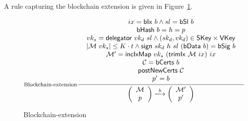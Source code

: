 \documentclass[11pt,a4paper]{article}
\newcommand{\fun}[1]{\mathsf{#1}}
\newcommand{\type}[1]{\mathsf{#1}}
\newcommand{\size}[1]{\left| #1 \right|}
\newcommand{\trans}[2]{\xlongrightarrow[\textsc{#1}]{#2}}
\newcommand{\SKey}{\type{SKey}}
\newcommand{\VKey}{\type{VKey}}
\newcommand{\hashname}{bHash}
\newcommand{\signname}{sign}
\newcommand{\delegatorname}{delegator} %
\newcommand{\signmapname}{\mathcal{M}}
\newcommand{\trimixname}{trimIx}
\newcommand{\incixmapname}{incIxMap}
\newcommand{\postnewcertsname}{postNewCerts}
\newcommand{\bdataname}{bData}
\newcommand{\bcertsname}{bCerts}
\newcommand{\bsigname}{bSig}
\newcommand{\bixname}{bIx}
\newcommand{\bslname}{bSl}
\newcommand{\sign}[4]{\fun{\signname}\ #1 ~ #2 ~ #3 ~ #4}
\newcommand{\hash}[1]{\fun{\hashname}\ #1}
\newcommand{\delegator}[2]{\fun{\delegatorname} ~ #1 ~ #2}
\newcommand{\signmap}[1]{\fun{\signmapname} ~ #1}
\newcommand{\trimix}[2]{\fun{\trimixname} ~ #1 ~ #2}
\newcommand{\incixmap}[3]{\fun{\incixmapname} ~ #1 ~ #2 ~ #3}
\newcommand{\postnewcerts}[1]{\fun{\postnewcertsname} ~ #1}
\newcommand{\bdata}[1]{\fun{\bdataname} ~ #1}
\newcommand{\bcerts}[1]{\fun{\bcertsname} ~ #1}
\newcommand{\bsig}[1]{\fun{\bsigname} ~ #1}
\newcommand{\bix}[1]{\fun{\bixname} ~ #1}
\newcommand{\bsl}[1]{\fun{\bslname} ~ #1}
\begin{document}
A rule capturing the blockchain extension is given in
Figure~\ref{fig:blockchain-extension}.

\begin{figure}
  \begin{equation*}
  \inference[Blockchain-extension]
  {
    {\begin{array}{c}
      ix = \bix{b} \wedge sl = \bsl{b} \\
      \hash{b} = h = p \\ %
      vk_s = \delegator{vk_d}{sl} \wedge (sk_d, vk_d) \in \SKey \times \VKey \\
      \size{\signmap{vk_s}} \leq K \cdot t \wedge \sign{sk_d}{h}{sl}{(\bdata{b})} = \bsig{b} \\
      \signmapname' = \incixmap{vk_s}{(\trimix{\signmapname}{ix})}{ix} \\
      \mathcal{C} = \bcerts{b} \\
      \postnewcerts{\mathcal{C}} \\
      p' = b 
    \end{array}}
  }
  {
    \left(
      {\begin{array}{c}
         \signmapname \\
         p
       \end{array}}
    \right)
    \trans{}{b}
    \left(
      {\begin{array}{c}
         \signmapname' \\
         p'
       \end{array}}
    \right)
 }
  \end{equation*}
  \caption{Blockchain-extension}
  \label{fig:blockchain-extension}
\end{figure}
\end{document}
